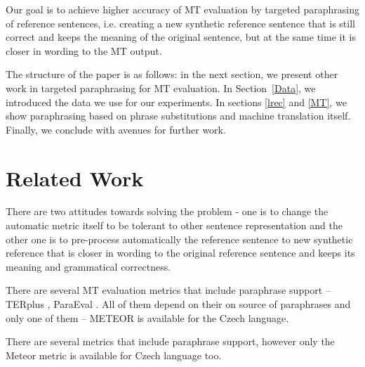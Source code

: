 \documentclass[11pt]{article}
\def \xxx#1{\textbf{\textcolor{red}{xxx: #1}}}
\def\Sref#1{Section~\ref{#1}}
\begin{document}
Our goal is  to achieve higher accuracy of MT evaluation by targeted 
paraphrasing of reference sentences, i.e. creating a new synthetic reference 
sentence that is still correct and keeps the meaning of the original sentence, 
but at the same time it is closer in wording to the MT output. 

The structure of the paper is as follows: in the next section, we present other
work in targeted paraphrasing for MT evaluation. In \Sref{Data}, we introduced
the data we use for our experiments.  In sections \ref{lrec} and \ref{MT}, 
we show paraphrasing based on phrase substitutions and machine translation 
itself. Finally, we conclude with avenues for further work.


\section{Related Work}
There are two attitudes towards solving the problem - one is to change the 
automatic metric itself to be tolerant to other sentence representation and the
other one is to pre-process automatically the reference sentence to new 
synthetic reference that is closer in wording to the original reference 
sentence and keeps its meaning and grammatical correctness.

There are several MT evaluation metrics that include paraphrase support --
TERplus \cite{terp}, ParaEval \cite{paraeval}. All of them depend on
their on source of paraphrases and only one of them -- METEOR 
\cite{meteor-wmt:2014} is available for the Czech language.

There are several metrics that include paraphrase support, however only the 
Meteor metric is available for Czech language too.%


\end{document}
